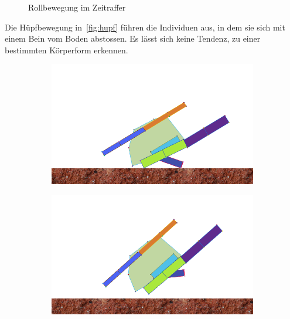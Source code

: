 \begin{figure}[H]
\begin{subfigure}[b]{0.3\textwidth}
          \caption{\label{fig:roll_6}}
        \end{subfigure}

        \caption{Rollbewegung im Zeitraffer\label{fig:roll}}

      \end{figure}

      Die Hüpfbewegung in~\vref{fig:hupf} führen die Individuen aus, in dem sie sich mit einem Bein vom Boden abstossen.
      Es lässt sich keine Tendenz, zu einer bestimmten Körperform erkennen.

      \begin{figure}[H]
        \centering

        \begin{subfigure}[b]{0.3\textwidth}
          \includegraphics[width=\linewidth,center]{graphics/simulation-discussion/hupf_1}
          \caption{\label{fig:hupf_1}}
        \end{subfigure}
        \hspace{\fill}
        \begin{subfigure}[b]{0.3\textwidth}
          \includegraphics[width=\linewidth,center]{graphics/simulation-discussion/hupf_2}

\end{subfigure}
\end{figure}
